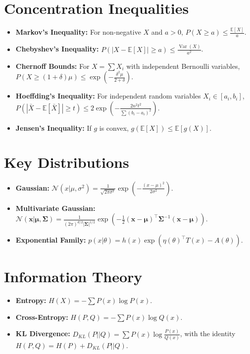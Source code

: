\documentclass[11pt]{article}
\DeclareMathOperator{\Var}{Var}
\begin{document}
\section{Concentration Inequalities}
\begin{itemize}
    \item \textbf{Markov's Inequality:} For non-negative \(X\) and \(a > 0\), \( P(X \ge a) \le \frac{\mathbb{E}[X]}{a} \).
    \item \textbf{Chebyshev's Inequality:} \( P(|X - \mathbb{E}[X]| \ge a) \le \frac{\Var(X)}{a^2} \).
    \item \textbf{Chernoff Bounds:} For \(X = \sum X_i\) with independent Bernoulli variables, \( P(X \ge (1+\delta)\mu) \le \exp\left(-\frac{\delta^2 \mu}{2+\delta}\right) \).
    \item \textbf{Hoeffding's Inequality:} For independent random variables \(X_i \in [a_i, b_i]\), \( P(|\bar{X} - \mathbb{E}[\bar{X}]| \ge t) \le 2\exp\left(-\frac{2n^2t^2}{\sum (b_i-a_i)^2}\right) \).
    \item \textbf{Jensen's Inequality:} If \(g\) is convex, \( g(\mathbb{E}[X]) \le \mathbb{E}[g(X)] \).
\end{itemize}

\section{Key Distributions}
\begin{itemize}
    \item \textbf{Gaussian:} \( \mathcal{N}(x | \mu, \sigma^2) = \frac{1}{\sqrt{2\pi\sigma^2}} \exp\left(-\frac{(x-\mu)^2}{2\sigma^2}\right) \).
    \item \textbf{Multivariate Gaussian:} \( \mathcal{N}(\mathbf{x} | \boldsymbol{\mu}, \boldsymbol{\Sigma}) = \frac{1}{(2\pi)^{d/2}|\boldsymbol{\Sigma}|^{1/2}} \exp\left(-\frac{1}{2}(\mathbf{x}-\boldsymbol{\mu})^\top \boldsymbol{\Sigma}^{-1} (\mathbf{x}-\boldsymbol{\mu})\right) \).
    \item \textbf{Exponential Family:} \( p(x|\theta) = h(x) \exp(\eta(\theta)^\top T(x) - A(\theta)) \).
\end{itemize}

\section{Information Theory}
\begin{itemize}
    \item \textbf{Entropy:} \( H(X) = -\sum P(x) \log P(x) \).
    \item \textbf{Cross-Entropy:} \( H(P, Q) = -\sum P(x) \log Q(x) \).
    \item \textbf{KL Divergence:} \( D_{KL}(P || Q) = \sum P(x) \log \frac{P(x)}{Q(x)} \), with the identity \( H(P,Q) = H(P) + D_{KL}(P||Q) \).
\end{itemize}
\end{document}

